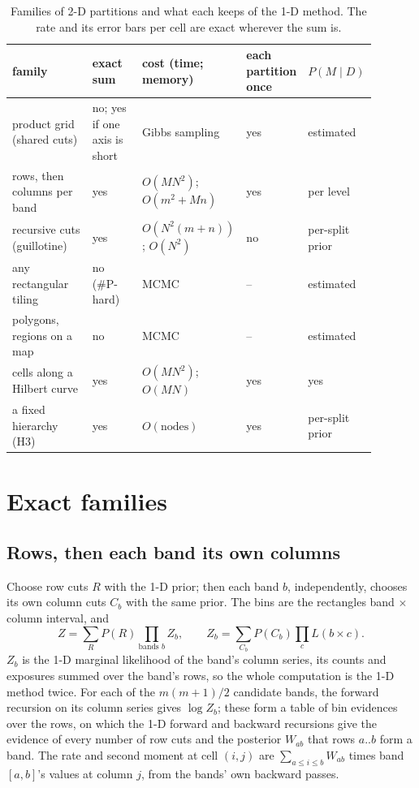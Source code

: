 \documentclass[11pt,a4paper]{article}
\begin{document}
\begin{table}[t]
\centering\small
\begin{tabular}{@{}p{0.27\linewidth}p{0.17\linewidth}p{0.21\linewidth}p{0.1\linewidth}p{0.14\linewidth}@{}}
\toprule
family & exact sum & cost (time; memory) & each partition once & $P(M \mid D)$ \\
\midrule
product grid (shared cuts) & no; yes if one axis is short & Gibbs sampling & yes & estimated \\
rows, then columns per band & yes & $O(MN^2)$; $O(m^2 + Mn)$ & yes & per level \\
recursive cuts (guillotine) & yes & $O(N^2(m+n))$; $O(N^2)$ & no & per-split prior \\
any rectangular tiling & no (\#P-hard) & MCMC & -- & estimated \\
polygons, regions on a map & no & MCMC & -- & estimated \\
cells along a Hilbert curve & yes & $O(MN^2)$; $O(MN)$ & yes & yes \\
a fixed hierarchy (H3) & yes & $O(\text{nodes})$ & yes & per-split prior \\
\bottomrule
\end{tabular}
\caption{Families of 2-D partitions and what each keeps of the 1-D method. The rate and its error
bars per cell are exact wherever the sum is.}
\label{tab:families}
\end{table}

\section{Exact families}\label{sec:exact}

\subsection{Rows, then each band its own columns}\label{sec:twolevel}

Choose row cuts $R$ with the 1-D prior; then each band $b$, independently, chooses its own column
cuts $C_b$ with the same prior. The bins are the rectangles band $\times$ column interval, and
\begin{equation}
  Z = \sum_R P(R) \prod_{\text{bands } b} Z_b, \qquad
  Z_b = \sum_{C_b} P(C_b) \prod_{c} L(b \times c).
  \label{eq:twolevel}
\end{equation}
$Z_b$ is the 1-D marginal likelihood of the band's column series, its counts and exposures summed
over the band's rows, so the whole computation is the 1-D method twice. For each of the
$m(m+1)/2$ candidate bands, the forward recursion on its column series gives $\log Z_b$; these form
a table of bin evidences over the rows, on which the 1-D forward and backward recursions give the
evidence of every number of row cuts and the posterior $W_{ab}$ that rows $a..b$ form a band. The
rate and second moment at cell $(i,j)$ are $\sum_{a \le i \le b} W_{ab}$ times band $[a,b]$'s values
at column $j$, from the bands' own backward passes.
\end{document}
